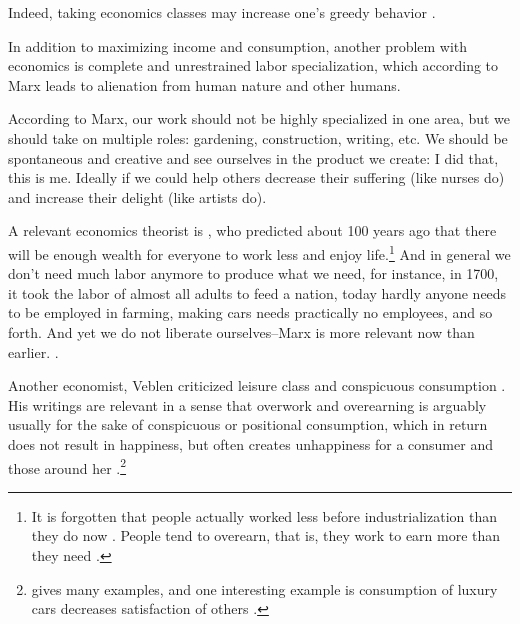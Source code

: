 \documentclass[10pt, letterpaper]{article}
\begin{document}
\begin{spacing}{1.8}
Indeed, taking economics classes may increase one's greedy behavior \citep{wang11b}.

In addition to maximizing income and consumption, another problem with economics
 is complete and unrestrained labor specialization, which according to Marx leads to alienation from human nature
and other humans.

According to Marx, our work should not be highly specialized in one area, but we should take on
multiple roles: gardening, construction, writing, etc. We should be spontaneous
and creative and see ourselves in the product we create: I did that, this is
me. %
Ideally if we could help others decrease their suffering (like nurses do) and
increase their delight (like artists do). 

A relevant economics theorist is \citet{keynes30}, who predicted about 100 years
ago that there will be enough wealth for everyone to work less and enjoy
life.\footnote{It is forgotten that people actually worked less before industrialization than they do now \citep{schor08}. People tend to overearn, that is, they work to earn more than they need \citep{hsee13}.}
And in general we don't need much labor anymore to produce what we need, for
instance,
 in 1700, it took the labor of almost all adults to feed a nation,
 today hardly anyone needs to be employed in farming, making cars needs
 practically no employees, and so forth. 
And yet we do not liberate ourselves--Marx is more relevant now than earlier.%
\citep{piketty14,peet15,menandMISC16oct3}. %

Another economist, Veblen criticized leisure class and conspicuous consumption
\citep{veblen05a,veblen05b}. His writings are relevant in a sense that overwork
and overearning is arguably usually for the sake of conspicuous or positional
consumption, which in return does not result in happiness, but often creates
unhappiness for a consumer and those around her
\citep{frank12,frank_nyt_mar_20_14,frank08,frank04,kasser13,schmuck00}.\footnote{\citet{frank12} gives many examples, and one interesting example is consumption of luxury cars decreases satisfaction of others \citep{winkelmann12}.}



\end{spacing}
\end{document}
